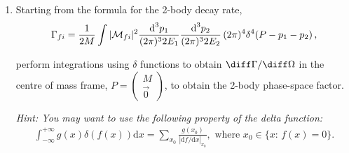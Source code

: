 \begin{enumerate}
    \item Starting from the formula for the 2-body decay rate,
          \begin{align*}
              \Gamma_{fi} = \frac{1}{2M} \int |\mathcal{M}_{fi}|^2
              \frac{\text{d}^3p_1}{(2\pi)^3 2E_1}
              \frac{\text{d}^3p_2}{(2\pi)^3 2E_2}\,
              (2\pi)^4 \delta^4(P - p_1 - p_2 )\,,
          \end{align*}


          perform integrations using $\delta$ functions to obtain $\diff \Gamma/\diff\Omega$ in the centre of mass frame, $P = \begin{pmatrix}M\\\vec{0}\end{pmatrix}$,
          to obtain the 2-body phase-space factor.

              {\em Hint: You may want to use the following property of the delta function:}
          \begin{align*}
              \int_{-\infty}^{+\infty} g(x) \delta(f(x)) \text{d}x = \sum_{x_0} \frac{g(x_0)}{|\text{d}f/\text{d}x|_{x_0}}, %
              \text{ where } x_0 \in \{x:\, f(x)=0\}.
          \end{align*}



\end{enumerate}
